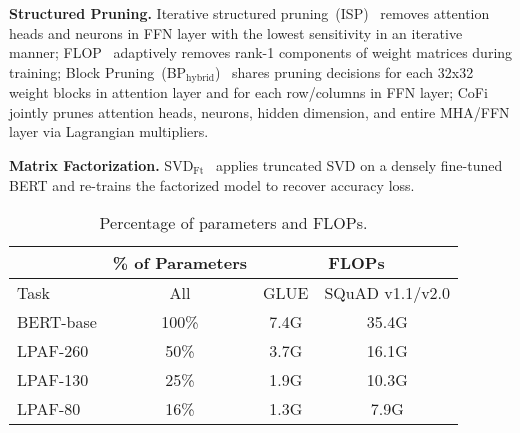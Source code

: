 \textbf{Structured Pruning.} 
Iterative structured pruning~(ISP)~\cite{isp} removes attention heads and neurons in FFN layer with the lowest sensitivity in an iterative manner; FLOP~\cite{flop} adaptively removes rank-1 components of weight matrices during training; Block Pruning~(BP$_{\text{hybrid}}$)~\cite{block} shares pruning decisions for each 32x32 weight blocks in attention layer and for each row/columns in FFN layer; CoFi~\cite{sp-l0} jointly prunes attention heads, neurons, hidden dimension, and entire MHA/FFN layer via Lagrangian multipliers.

\textbf{Matrix Factorization. }SVD$_{\text{Ft}}$~\cite{svd} applies truncated SVD on a densely fine-tuned BERT and re-trains the factorized model to recover accuracy loss.

\begin{table}[t]
	\scriptsize
	\centering
	\begin{tabular}{l|cc|cc}
		\toprule
		& \multicolumn{2}{c|}{\textbf{\% of Parameters}} & \multicolumn{2}{c}{\textbf{FLOPs}} \\ 
		\midrule
		Task         & \multicolumn{2}{c|}{All}          & GLUE    & SQuAD v1.1/v2.0    \\ 
		\midrule
		BERT-base    & \multicolumn{2}{c|}{100\%}          & 7.4G      & 35.4G         \\
		\midrule
		LPAF-260     & \multicolumn{2}{c|}{50\%}           & 3.7G      & 16.1G         \\
		LPAF-130     & \multicolumn{2}{c|}{25\%}           & 1.9G      & 10.3G         \\
		LPAF-80      & \multicolumn{2}{c|}{16\%}           & 1.3G      & 7.9G          \\
		\bottomrule
	\end{tabular}
	\caption{Percentage of parameters and FLOPs. 
	}
	\label{table:stats}
\end{table}

